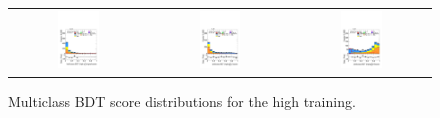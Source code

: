 \begin{figure}[htbp]
  \centering
  \setlength{\tabcolsep}{1.5pt}
  \renewcommand{\arraystretch}{0}
  \begin{tabular}{@{}c c c@{}}
    \includegraphics[width=0.32\textwidth]{images/plots_overtrain_gt200/plot_tth_signal_multiclass_gt200_hh_tth.pdf} &
    \includegraphics[width=0.32\textwidth]{images/plots_overtrain_gt200/plot_tth_Z_multiclass_gt200_hh_tth.pdf} &  
    \includegraphics[width=0.32\textwidth]{images/plots_overtrain_gt200/plot_tth_ttbar_multiclass_gt200_hh_tth.pdf} 
  \end{tabular}
  \caption{Multiclass BDT score distributions for the high \pth training.}
  \label{highpt_modelling}
\end{figure}
